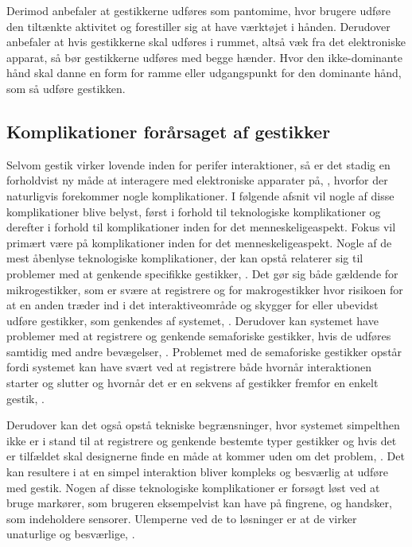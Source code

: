 Derimod anbefaler \textcite[s. 823]{PDF:UnderstandingNaturalness} at gestikkerne udføres som pantomime, hvor brugere udføre den tiltænkte aktivitet og forestiller sig at have værktøjet i hånden. Derudover anbefaler \textcite[s. 824]{PDF:UnderstandingNaturalness} at hvis gestikkerne skal udføres i rummet, altså væk fra det elektroniske apparat, så bør gestikkerne udføres med begge hænder. Hvor den ikke-dominante hånd skal danne en form for ramme eller udgangspunkt for den dominante hånd, som så udføre gestikken.      
%

\subsection{Komplikationer forårsaget af gestikker}
\label{KomplikationerGestikker}
%
Selvom gestik virker lovende inden for perifer interaktioner, så er det stadig en forholdvist ny måde at interagere med elektroniske apparater på, \parencite[s. 163]{PDF:ComparingInputModalities}, hvorfor der naturligvis forekommer nogle komplikationer. I følgende afsnit vil nogle af disse komplikationer blive belyst, først i forhold til teknologiske komplikationer og derefter i forhold til komplikationer inden for det menneskeligeaspekt. Fokus vil primært være på komplikationer inden for det menneskeligeaspekt. \blankline
%
Nogle af de mest åbenlyse teknologiske komplikationer, der kan opstå relaterer sig til problemer med at genkende specifikke gestikker, \parencite[s. 27]{PDF:ATaxonomyOfGestures}. Det gør sig både gældende for mikrogestikker, som er svære at registrere og for makrogestikker hvor risikoen for at en anden træder ind i det interaktiveområde og skygger for eller ubevidst udføre gestikker, som genkendes af systemet, \parencite[s. 9]{PDF:UsabilityofMicroVsMacroGestures}. Derudover kan systemet have problemer med at registrere og genkende semaforiske gestikker, hvis de udføres samtidig med andre bevægelser, \parencite[s. 27]{PDF:ATaxonomyOfGestures}. Problemet med de semaforiske gestikker opstår fordi systemet kan have svært ved at registrere både hvornår interaktionen starter og slutter og hvornår det er en sekvens af gestikker fremfor en enkelt gestik, \parencite[s. 27]{PDF:ATaxonomyOfGestures}. 

Derudover kan det også opstå tekniske begrænsninger, hvor systemet simpelthen ikke er i stand til at registrere og genkende bestemte typer gestikker og hvis det er tilfældet skal designerne finde en måde at kommer uden om det problem, \parencite[s. 27]{PDF:ATaxonomyOfGestures}. Det kan resultere i at en simpel interaktion bliver kompleks og besværlig at udføre med gestik. Nogen af disse teknologiske komplikationer er forsøgt løst ved at bruge markører, som brugeren eksempelvist kan have på fingrene, og handsker, som indeholdere sensorer. Ulemperne ved de to løsninger er at de virker unaturlige og besværlige, \parencite[s. 26]{PDF:ATaxonomyOfGestures}.\blankline
%






